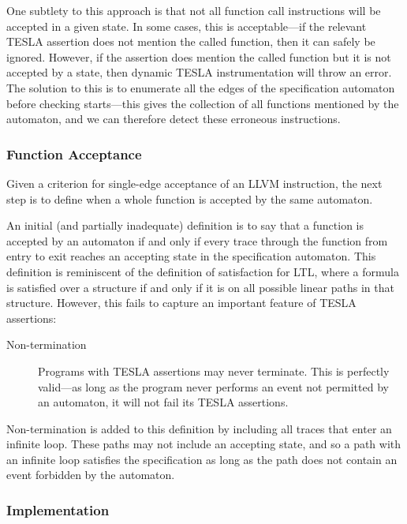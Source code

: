 One subtlety to this approach is that not all function call instructions will be
accepted in a given state. In some cases, this is acceptable---if the relevant
TESLA assertion does not mention the called function, then it can safely be
ignored. However, if the assertion does mention the called function but it is
not accepted by a state, then dynamic TESLA instrumentation will throw an error.
The solution to this is to enumerate all the edges of the specification
automaton before checking starts---this gives the collection of all functions
mentioned by the automaton, and we can therefore detect these erroneous
instructions.

\subsubsection{Function Acceptance}

Given a criterion for single-edge acceptance of an LLVM instruction, the next step
is to define when a whole function is accepted by the same automaton.

An initial (and partially inadequate) definition is to say that a function is
accepted by an automaton if and only if every trace through the function
from entry to exit reaches an accepting state in the specification automaton.
This definition is reminiscent of the definition of satisfaction for LTL, where
a formula is satisfied over a structure if and only if it is on all possible
linear paths in that structure. However, this fails to capture an important
feature of TESLA assertions:
\begin{description}
  \item[Non-termination] Programs with TESLA assertions may never
    terminate. This is perfectly valid---as long as the program never
    performs an event not permitted by an automaton, it will not fail
    its TESLA assertions.
\end{description}

Non-termination is added to this definition by including all traces that enter
an infinite loop. These paths may not include an accepting state, and so a path
with an infinite loop satisfies the specification as long as the path does not
contain an event forbidden by the automaton.

\subsubsection{Implementation}

